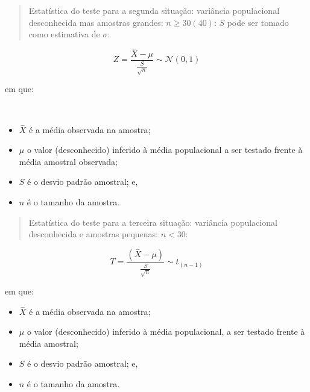 \documentclass[
]{book}
\providecommand{\tightlist}{%
  \setlength{\itemsep}{0pt}\setlength{\parskip}{0pt}}
\begin{document}
\hfill\break

\begin{quote}
Estatística do teste para a segunda situação: variância populacional desconhecida mas amostras grandes: \(n\ge30(40)\): \(S\) pode ser tomado como estimativa de \(\sigma\):
\end{quote}

\hfill\break

\[
Z = \frac{\stackrel{-}{X} - \mu}{\frac{S}{\sqrt{n}}}   \sim \mathcal{N}(0,1)
\]

\hfill\break

em que:\\
\strut \\

\begin{itemize}
\tightlist
\item
  \(\stackrel{-}{X}\) é a média observada na amostra;\\
\item
  \(\mu\) o valor (desconhecido) inferido à média populacional a ser testado frente à média amostral observada;\\
\item
  \(S\) é o desvio padrão amostral; e,\\
\item
  \(n\) é o tamanho da amostra.
\end{itemize}

\hfill\break

\begin{quote}
Estatística do teste para a terceira situação: variância populacional desconhecida e amostras pequenas: \(n<30\):
\end{quote}

\hfill\break

\[
T = \frac{(\stackrel{-}{X} - \mu)}{    \frac{S}{\sqrt{n}} } \sim t_{(n-1)}
\]

\hfill\break

em que:\\

\begin{itemize}
\tightlist
\item
  \(\stackrel{-}{X}\) é a média observada na amostra;\\
\item
  \(\mu\) o valor (desconhecido) inferido à média populacional, a ser testado frente à média amostral;\\
\item
  \(S\) é o desvio padrão amostral; e,\\
\item
  \(n\) é o tamanho da amostra.
\end{itemize}
\end{document}
